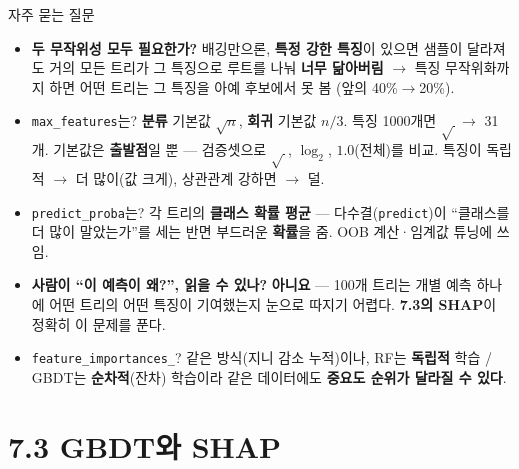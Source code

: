 \documentclass[aspectratio=169,11pt]{beamer}
\begin{document}
\begin{frame}{자주 묻는 질문}
  \small
  \begin{itemize}
    \item \textbf{두 무작위성 모두 필요한가?} 배깅만으론, \textbf{특정
      강한 특징}이 있으면 샘플이 달라져도 거의 모든 트리가 그 특징으로
      루트를 나눠 \textbf{너무 닮아버림} $\to$ 특징 무작위화까지 하면
      어떤 트리는 그 특징을 아예 후보에서 못 봄 (앞의 40\%$\to$20\%).
    \item \texttt{max\_features}는? \textbf{분류} 기본값 $\sqrt{n}$,
      \textbf{회귀} 기본값 $n/3$. 특징 1000개면 $\sqrt{\,}\to$ 31개.
      기본값은 \textbf{출발점}일 뿐 — 검증셋으로 $\sqrt{\,}$, $\log_2$,
      $1.0$(전체)를 비교. 특징이 독립적 $\to$ 더 많이(값 크게),
      상관관계 강하면 $\to$ 덜.
    \item \texttt{predict\_proba}는? 각 트리의 \textbf{클래스 확률
      평균} — 다수결(\texttt{predict})이 ``클래스를 더 많이 말았는가''를
      세는 반면 부드러운 \textbf{확률}을 줌. OOB 계산·임계값 튜닝에
      쓰임.
    \item \textbf{사람이 ``이 예측이 왜?'', 읽을 수 있나?} \textbf{아니요}
      — 100개 트리는 개별 예측 하나에 어떤 트리의 어떤 특징이 기여했는지
      눈으로 따지기 어렵다. \textbf{7.3의 SHAP}이 정확히 이 문제를 푼다.
    \item \texttt{feature\_importances\_}? 같은 방식(지니 감소 누적)이나,
      RF는 \textbf{독립적} 학습 / GBDT는 \textbf{순차적}(잔차) 학습이라
      같은 데이터에도 \textbf{중요도 순위가 달라질 수 있다}.
  \end{itemize}
\end{frame}

\section{7.3 GBDT와 SHAP}

\end{document}
